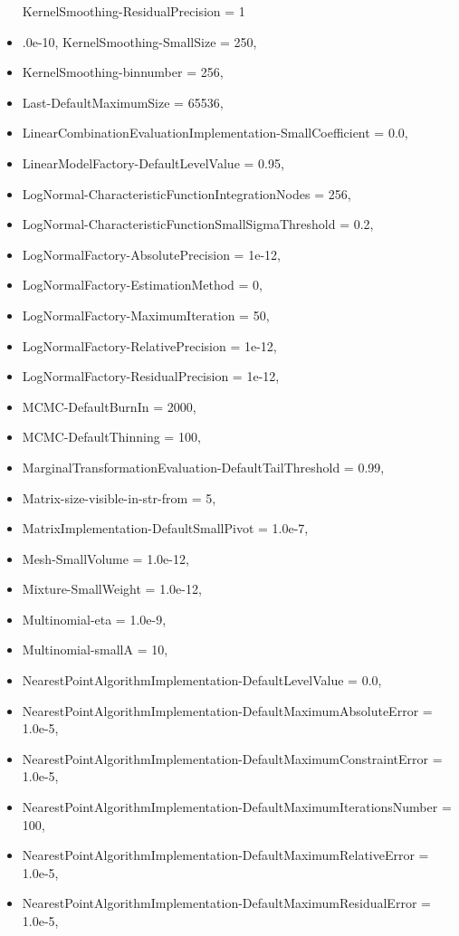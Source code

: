 \begin{itemize}
  KernelSmoothing-ResidualPrecision = 1
\item .0e-10,
  KernelSmoothing-SmallSize = 250,
\item
  KernelSmoothing-binnumber = 256,
\item
  Last-DefaultMaximumSize = 65536,
\item
  LinearCombinationEvaluationImplementation-SmallCoefficient = 0.0,
\item
  LinearModelFactory-DefaultLevelValue = 0.95,
\item
  LogNormal-CharacteristicFunctionIntegrationNodes = 256,
\item
  LogNormal-CharacteristicFunctionSmallSigmaThreshold = 0.2,
\item
  LogNormalFactory-AbsolutePrecision = 1e-12,
\item
  LogNormalFactory-EstimationMethod = 0,
\item
  LogNormalFactory-MaximumIteration = 50,
\item
  LogNormalFactory-RelativePrecision = 1e-12,
\item
  LogNormalFactory-ResidualPrecision = 1e-12,
\item
  MCMC-DefaultBurnIn = 2000,
\item
  MCMC-DefaultThinning = 100,
\item
  MarginalTransformationEvaluation-DefaultTailThreshold = 0.99,
\item
  Matrix-size-visible-in-str-from = 5,
\item
  MatrixImplementation-DefaultSmallPivot = 1.0e-7,
\item
  Mesh-SmallVolume = 1.0e-12,
\item
  Mixture-SmallWeight = 1.0e-12,
\item
  Multinomial-eta = 1.0e-9,
\item
  Multinomial-smallA = 10,
\item
  NearestPointAlgorithmImplementation-DefaultLevelValue = 0.0,
\item
  NearestPointAlgorithmImplementation-DefaultMaximumAbsoluteError = 1.0e-5,
\item
  NearestPointAlgorithmImplementation-DefaultMaximumConstraintError = 1.0e-5,
\item
  NearestPointAlgorithmImplementation-DefaultMaximumIterationsNumber = 100,
\item
  NearestPointAlgorithmImplementation-DefaultMaximumRelativeError = 1.0e-5,
\item
  NearestPointAlgorithmImplementation-DefaultMaximumResidualError = 1.0e-5,

\end{itemize}
